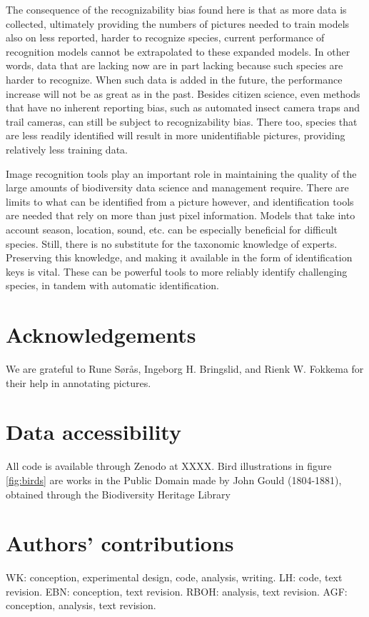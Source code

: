\documentclass{article}
\begin{document}
The consequence of the recognizability bias found here is that as more data is collected, ultimately providing the numbers of pictures needed to train models also on less reported, harder to recognize species, current performance of recognition models cannot be extrapolated to these expanded models. In other words, data that are lacking now are in part lacking because such species are harder to recognize. When such data is added in the future, the performance increase will not be as great as in the past. Besides citizen science, even methods that have no inherent reporting bias, such as automated insect camera traps and trail cameras, can still be subject to recognizability bias. There too, species that are less readily identified will result in more unidentifiable pictures, providing relatively less training data.

Image recognition tools play an important role in maintaining the quality of the large amounts of biodiversity data science and management require. There are limits to what can be identified from a picture however, and identification tools are needed that rely on more than just pixel information. Models that take into account season, location, sound, etc. can be especially beneficial for difficult species. Still, there is no substitute for the taxonomic knowledge of experts. Preserving this knowledge, and making it available in the form of identification keys is vital. These can be powerful tools to more reliably identify challenging species, in tandem with automatic identification.



\section*{Acknowledgements}
We are grateful to Rune Sørås, Ingeborg H. Bringslid, and Rienk W. Fokkema for their help in annotating pictures.

\section*{Data accessibility}
All code is available through Zenodo at XXXX. Bird illustrations in figure \ref{fig:birds} are works in the Public Domain made by John Gould (1804-1881), obtained through the Biodiversity Heritage Library~\cite{bhl1,bhl2,bhl3}

\section*{Authors’ contributions}
WK: conception, experimental design, code, analysis, writing. LH: code, text revision. EBN: conception, text revision. RBOH: analysis, text revision. AGF: conception, analysis, text revision.
\end{document}
